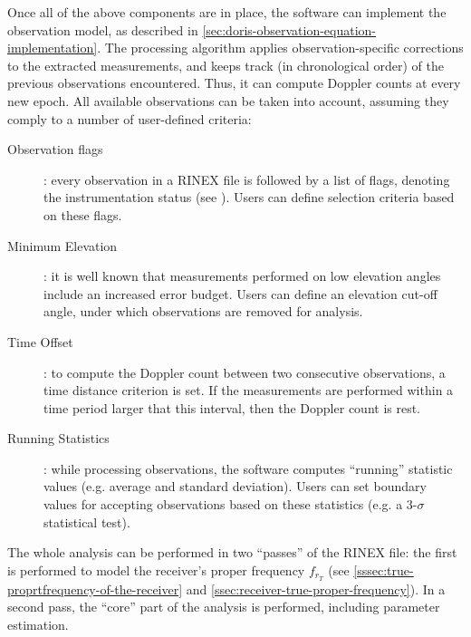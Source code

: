 Once all of the above components are in place, the software can implement the 
observation model, as described in \autoref{sec:doris-observation-equation-implementation}.
The processing algorithm applies observation-specific corrections to the extracted 
measurements, and keeps track (in chronological order) of the previous observations 
encountered. Thus, it can compute Doppler counts at every new epoch. All available 
observations can be taken into account, assuming they comply to a number of user-defined 
criteria:
\begin{description}
  \item[Observation flags]: every observation in a RINEX file is followed by 
    a list of flags, denoting the instrumentation status (see \cite{DORISRNX3}). Users 
    can define selection criteria based on these flags.
  \item[Minimum Elevation]: it is well known that measurements performed on low 
    elevation angles include an increased error budget. Users can define an 
    elevation cut-off angle, under which observations are removed for analysis.
  \item[Time Offset]: to compute the Doppler count between two consecutive observations, 
    a time distance criterion is set. If the measurements are performed within a  
    time period larger that this interval, then the Doppler count is rest.
  \item[Running Statistics]: while processing observations, the software computes 
    ``running'' statistic values (e.g. average and standard deviation). Users can 
    set boundary values for accepting observations based on these statistics (e.g. 
    a 3-$\sigma$ statistical test).
\end{description}

The whole analysis can be performed in two ``passes'' of the RINEX file: the first is 
performed to model the receiver's proper frequency $f_{r_T}$ (see 
\autoref{sssec:true-proprtfrequency-of-the-receiver} and \autoref{ssec:receiver-true-proper-frequency}). 
In a second pass, the ``core'' part of the analysis is performed, including 
parameter estimation.
